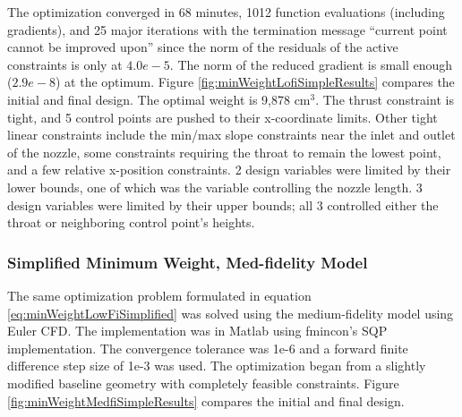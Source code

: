 \documentclass{article}
\begin{document}
The optimization converged in 68 minutes, 1012 function evaluations (including gradients), and 25 major iterations with the termination message ``current point cannot be improved upon'' since the norm of the residuals of the active constraints is only at $4.0e-5$. The norm of the reduced gradient is small enough ($2.9e-8$) at the optimum. Figure \ref{fig:minWeightLofiSimpleResults} compares the initial and final design. The optimal weight is 9,878 $\textrm{cm}^3$. The thrust constraint is tight, and 5 control points are pushed to their x-coordinate limits. Other tight linear constraints include the min/max slope constraints near the inlet and outlet of the nozzle, some constraints requiring the throat to remain the lowest point, and a few relative x-position constraints. 2 design variables were limited by their lower bounds, one of which was the variable controlling the nozzle length. 3 design variables were limited by their upper bounds; all 3 controlled either the throat or neighboring control point's heights.

\subsubsection{Simplified Minimum Weight, Med-fidelity Model}

The same optimization problem formulated in equation \ref{eq:minWeightLowFiSimplified} was solved using the medium-fidelity model using Euler CFD. The implementation was in Matlab using fmincon's SQP implementation. The convergence tolerance was 1e-6 and a forward finite difference step size of 1e-3 was used. The optimization began from a slightly modified baseline geometry with completely feasible constraints. Figure \ref{fig:minWeightMedfiSimpleResults} compares the initial and final design.
\end{document}
